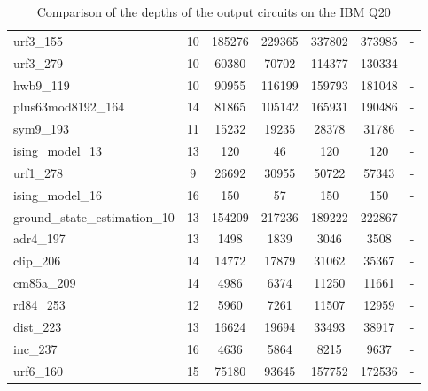 \documentclass[runningheads]{llncs}
\begin{document}
\begin{table}[!ht]
\begin{center}
\begin{tabular}{|p{4.3cm}<{\centering}|c|c|c|c|c|c|}
						   urf3\_155 & 10 & 185276 & 229365 & 337802 & 373985 & - \\
						   urf3\_279 & 10 & 60380 & 70702 & 114377 & 130334 & - \\
						   hwb9\_119 & 10 & 90955 & 116199 & 159793 & 181048 & - \\
						   plus63mod8192\_164 & 14 & 81865 & 105142 & 165931 & 190486 & - \\
						   sym9\_193 & 11 & 15232 & 19235 & 28378 & 31786 & - \\
						   ising\_model\_13 & 13 & 120 & 46 & 120 & 120 & - \\
						   urf1\_278 & 9 & 26692 & 30955 & 50722 & 57343 & - \\
						   ising\_model\_16 & 16 & 150 & 57 & 150 & 150 & - \\
						   ground\_state\_estimation\_10 & 13 & 154209 & 217236 & 189222 & 222867 & - \\
						   adr4\_197 & 13 & 1498 & 1839 & 3046 & 3508 & - \\
						   clip\_206 & 14 & 14772 & 17879 & 31062 & 35367 & - \\
						   cm85a\_209 & 14 & 4986 & 6374 & 11250 & 11661 & - \\
						   rd84\_253 & 12 & 5960 & 7261 & 11507 & 12959 & - \\
						   dist\_223 & 13 & 16624 & 19694 & 33493 & 38917 & - \\
						   inc\_237 & 16 & 4636 & 5864 & 8215 & 9637 & - \\
						   urf6\_160 & 15 & 75180 & 93645 & 157752 & 172536 & - \\
						   \hline
					\end{tabular} 
					\end{center}						
					\caption{Comparison of  the depths of the output circuits on the IBM Q20} 
					\label{tab11}
				\end{table}		
\end{document}

